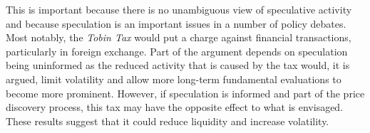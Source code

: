 \documentclass[preprint,12pt,authoryear]{elsarticle}
\begin{document}
This is important because there is no unambiguous view of speculative activity and because speculation is an important issues in a number of policy debates.  Most notably, the \emph{Tobin Tax} would put a charge against financial transactions, particularly in foreign exchange.  Part of the argument depends on speculation being uninformed as the reduced activity that is caused by the tax would, it is argued, limit volatility and allow more long-term fundamental evaluations to become more prominent.  However, if speculation is informed and part of the price discovery process, this tax may have the opposite effect to what is envisaged.  These results suggest that it could reduce liquidity and increase volatility. 


\end{document}
